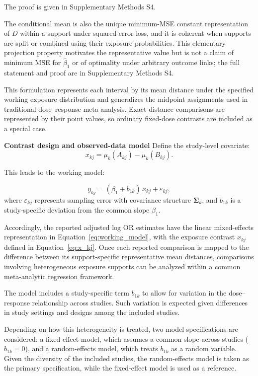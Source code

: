 \documentclass[journal=rsm]{CUP-JNL-DTM}%
\theoremstyle{definition}
\numberwithin{equation}{section}
\begin{document}
The proof is given in Supplementary Methods S4.

The conditional mean is also the unique minimum-MSE constant representation of
$D$ within a support under squared-error loss, and it is coherent when supports
are split or combined using their exposure probabilities. This elementary
projection property motivates the representative value but is not a claim of
minimum MSE for $\hat\beta_1$ or of optimality under arbitrary outcome links;
the full statement and proof are in Supplementary Methods S4.

This formulation represents each interval by its mean distance under the
specified working exposure distribution and generalizes the midpoint
assignments used in traditional dose--response meta-analysis. Exact-distance
comparisons are represented by their point values, so ordinary fixed-dose
contrasts are included as a special case.


\noindent\textbf{Contrast design and observed-data model} \label{sec:log_or}
Define the study-level covariate:
%
\begin{equation}
  x_{kj}
  =
  \mu_k(A_{kj})-\mu_k(B_{kj}).
  \label{eq:x_kj}
\end{equation}
%

This leads to the working model:
%

\begin{equation}
  y_{kj} = (\beta_1 + b_{1k})\, x_{kj} + \varepsilon_{kj},
  \label{eq:working_model}
\end{equation}
%
where $\varepsilon_{kj}$ represents sampling error with covariance structure $\boldsymbol{\Sigma}_k$, and $b_{1k}$ is a study-specific deviation from the common slope $\beta_1$.

Accordingly, the reported adjusted log OR estimates have the linear mixed-effects
representation in Equation~\eqref{eq:working_model}, with the exposure
contrast $x_{kj}$ defined in Equation~\eqref{eq:x_kj}.
 Once each reported comparison is mapped to the difference between its
support-specific representative mean distances, comparisons involving heterogeneous
exposure supports can be analyzed within a common meta-analytic regression
framework.

The model includes a study-specific term $b_{1k}$ to allow for variation in the dose–response relationship across studies. Such variation is expected given differences in study settings and designs among the included studies.

Depending on how this heterogeneity is treated, two model specifications are considered: a fixed-effect model, which assumes a common slope across studies ($b_{1k} = 0$), and a random-effects model, which treats $b_{1k}$ as a random variable. Given the diversity of the included studies, the random-effects model is taken as the primary specification, while the fixed-effect model is used as a reference.
\end{document}
